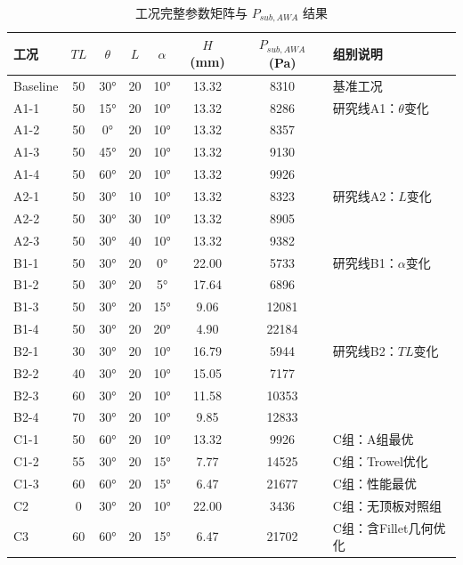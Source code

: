 \begin{table}[!htb]
  \centering
  \caption{工况完整参数矩阵与 $P_{sub,AWA}$ 结果}\label{tab:4.1}
  \renewcommand{\arraystretch}{1.2}
  \footnotesize
  \begin{tabular}{lccccccp{3cm}}
    \toprule
    \textbf{工况} & $TL$ & $\theta$ & $L$ & $\alpha$ & $H$ (mm) & $P_{sub,AWA}$ (Pa) & \textbf{组别说明} \\
    \midrule
    Baseline & 50 & 30° & 20 & 10° & 13.32 & 8310  & 基准工况 \\
    A1-1     & 50 & 15° & 20 & 10° & 13.32 & 8286  & 研究线A1：$\theta$变化 \\
    A1-2     & 50 & 0°  & 20 & 10° & 13.32 & 8357  &  \\
    A1-3     & 50 & 45° & 20 & 10° & 13.32 & 9130  &  \\
    A1-4     & 50 & 60° & 20 & 10° & 13.32 & 9926  &  \\
    A2-1     & 50 & 30° & 10 & 10° & 13.32 & 8323  & 研究线A2：$L$变化 \\
    A2-2     & 50 & 30° & 30 & 10° & 13.32 & 8905  &  \\
    A2-3     & 50 & 30° & 40 & 10° & 13.32 & 9382  &  \\
    B1-1     & 50 & 30° & 20 & 0°  & 22.00 & 5733  & 研究线B1：$\alpha$变化 \\
    B1-2     & 50 & 30° & 20 & 5°  & 17.64 & 6896  &  \\
    B1-3     & 50 & 30° & 20 & 15° & 9.06  & 12081 &  \\
    B1-4     & 50 & 30° & 20 & 20° & 4.90  & 22184 &  \\
    B2-1     & 30 & 30° & 20 & 10° & 16.79 & 5944  & 研究线B2：$TL$变化 \\
    B2-2     & 40 & 30° & 20 & 10° & 15.05 & 7177  &  \\
    B2-3     & 60 & 30° & 20 & 10° & 11.58 & 10353 &  \\
    B2-4     & 70 & 30° & 20 & 10° & 9.85  & 12833 &  \\
    C1-1     & 50 & 60° & 20 & 10° & 13.32 & 9926  & C组：A组最优 \\
    C1-2     & 55 & 30° & 20 & 15° & 7.77  & 14525 & C组：Trowel优化 \\
    C1-3     & 60 & 60° & 20 & 15° & 6.47  & 21677 & C组：性能最优 \\
    C2       & 0  & 30° & 20 & 10° & 22.00 & 3436  & C组：无顶板对照组 \\
    C3       & 60 & 60° & 20 & 15° & 6.47  & 21702 & C组：含Fillet几何优化 \\
    \bottomrule
  \end{tabular}
\end{table}

